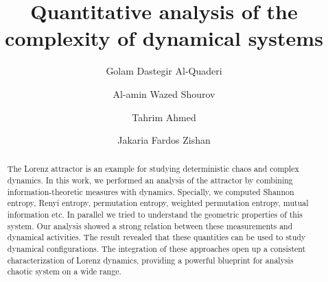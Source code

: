 \documentclass[%
reprint,
amsmath,amssymb,
aps,
floatfix,
]{revtex4-2}
\begin{document}
	
	
	\title{Quantitative analysis of the complexity of dynamical systems}

	
	\author{Golam Dastegir Al-Quaderi}
	\author{Al-amin Wazed Shourov}

	\author{Tahrim Ahmed}
	\author{Jakaria Fardos Zishan}

	
	\begin{abstract}
		The Lorenz attractor is an example for studying deterministic chaos and complex dynamics. In this work, we performed an analysis of the attractor by combining information-theoretic measures with dynamics. Specially, we computed Shannon entropy, Renyi entropy, permutation entropy, weighted permutation entropy, mutual information etc. In parallel we tried to understand the geometric properties of this system. Our analysis showed a strong relation between these measurements and dynamical activities. The result revealed that these quantities can be used to study dynamical configurations. The integration of these approaches open up a consistent characterization of Lorenz dynamics, providing a powerful blueprint for analysis chaotic system on a wide range.
		
	\end{abstract}
	
	\maketitle
	
\end{document}
